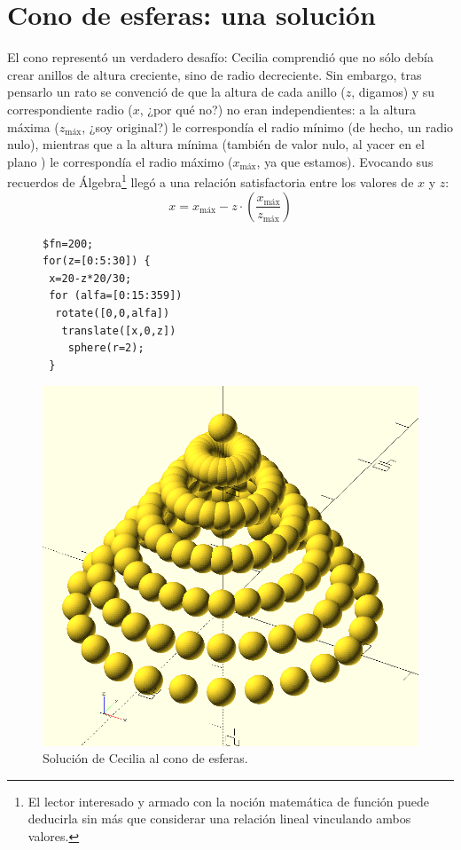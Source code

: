 \section{Cono de esferas: una solución}
  

El cono representó un verdadero desafío: Cecilia comprendió que no
sólo debía crear anillos de altura creciente, sino de radio
decreciente. Sin embargo, tras pensarlo un rato se convenció de que la
altura de cada anillo ($z$, digamos) y su correspondiente radio ($x$,
¿por qué no?) no eran independientes: a la altura máxima
($z_{\text{máx}}$, ¿soy original?) le correspondía el radio mínimo (de
hecho, un radio nulo), mientras que a la altura mínima (también de
valor nulo, al yacer en el plano ) le correspondía el radio
máximo ($x_{\text{máx}}$, ya que estamos). Evocando sus recuerdos de
Álgebra\footnote{El lector interesado y armado con la noción
  matemática de función puede deducirla sin más que considerar una
  relación lineal vinculando ambos valores.}  llegó a una relación
satisfactoria entre los valores de $x$ y $z$:
  \[x = x_{\text{máx}} - z \cdot \left( \frac{x_{\text{máx}}}{z_{\text{máx}}} \right) \]
  \begin{figure}[ht]
  \begin{minipage}[]{.5\textwidth}
    \begin{lstlisting}
$fn=200;
for(z=[0:5:30]) {
 x=20-z*20/30;
 for (alfa=[0:15:359]) 
  rotate([0,0,alfa])
   translate([x,0,z])
    sphere(r=2);
 }
    \end{lstlisting}%
  \end{minipage}\hfill
    \begin{minipage}[]{.5\textwidth}
      \centering
      \includegraphics[width=.75\textwidth]{imagenes/cono-de-esferas}
    \end{minipage}
    \caption{Solución de Cecilia al cono de esferas.}
    \label{fig:cono-de-esferas}
  \end{figure}


